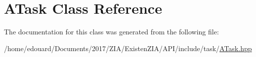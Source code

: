 \hypertarget{classATask}{}\section{A\+Task Class Reference}
\label{classATask}


The documentation for this class was generated from the following file\+:\begin{DoxyCompactItemize}
\item 
/home/edouard/\+Documents/2017/\+Z\+I\+A/\+Existen\+Z\+I\+A/\+A\+P\+I/include/task/\mbox{\hyperlink{ATask_8hpp}{A\+Task.\+hpp}}\end{DoxyCompactItemize}
